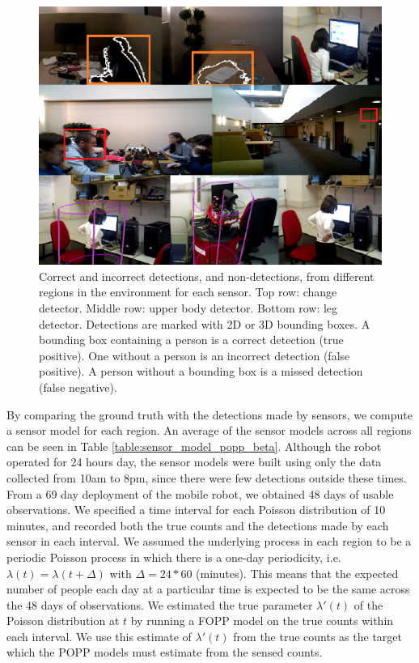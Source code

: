 \begin{figure}[t]
	\centering
	\includegraphics[width=0.95\columnwidth]{./figures/sensor_images.png}
	\caption{Correct and incorrect detections, and non-detections, from different regions in the environment for each sensor. Top row: change detector. Middle row: upper body detector. Bottom row: leg detector. Detections are marked with 2D or 3D bounding boxes. A bounding box containing a person is a correct detection (true positive). One without a person is an incorrect detection (false positive). A person without a bounding box is a missed detection (false negative).}
	\label{fig:single_sensor_rate_transformation}
\end{figure}

By comparing the ground truth with the detections made by sensors, we compute a sensor model for each region. An average of the sensor models across all regions can be seen in Table \ref{table:sensor_model_popp_beta}. Although the robot operated for 24 hours day, the sensor models were built using only the data collected from 10am to 8pm, since there were few detections outside these times. From a 69 day deployment of the mobile robot, we obtained 48 days of usable observations. We specified a time interval for each Poisson distribution of 10 minutes, and recorded both the true counts and the detections made by each sensor in each interval. We assumed the underlying process in each region to be a periodic Poisson process in which there is a one-day periodicity, i.e. $\lambda(t) = \lambda(t + \Delta)$ with $\Delta = 24 * 60$ (minutes). This means that the expected number of people each day at a particular time is expected to be the same across the 48 days of observations. We estimated the true parameter $\lambda'(t)$ of the Poisson distribution at $t$ by running a FOPP model on the true counts within each interval. We use this estimate of $\lambda'(t)$ from the true counts as the target which the POPP models must estimate from the sensed counts.

